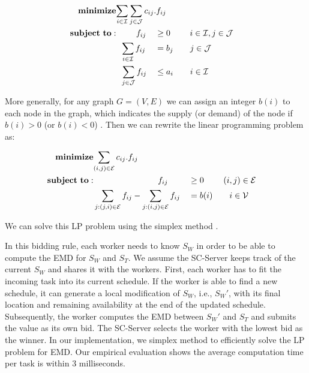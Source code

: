 \setcounter{equation}{0}
\begin{alignat}{2}
\mathbf{minimize}&\mathrlap{\sum_{i \in \mathcal{I}} \sum_{j \in \mathcal{J}} c_{ij}.f_{ij}} \notag\\
\mathbf{subject\ to:}&\phantom{{a}={a}} f_{ij} && \geq 0 \ \quad\quad i \in \mathcal{I}, j \in \mathcal{J}\\
&\phantom{{a}}\sum_{i \in \mathcal{I}} f_{ij} &&= b_j \quad\quad j \in \mathcal{J}\\
&\phantom{{a}}\sum_{j \in \mathcal{J}} f_{ij} &&\leq a_i \quad\quad i \in \mathcal{I}
\end{alignat}

More generally, for any graph $G = (V, E)$ we can assign an integer $b(i)$ to each node in the graph, which indicates the supply (or demand) of the node if $b(i) > 0$ (or $b(i) < 0$) . Then we can rewrite the linear programming problem as: 

\setcounter{equation}{0}
\begin{alignat}{2}
\mathbf{minimize}&\mathrlap{\sum_{(i,j) \in \mathcal{E}} c_{ij}.f_{ij}} \notag\\
\mathbf{subject\ to:}&\phantom{{a}={a}{a}={a}{a}={a}{a}} f_{ij} && \geq 0 \ \quad\quad (i,j) \in \mathcal{E}\\
&\sum_{j:(j,i) \in \mathcal{E}} f_{ij} - \sum_{j:(i,j) \in \mathcal{E}} f_{ij} &&= b(i) \quad\quad i \in \mathcal{V}
\end{alignat}

\noindent We can solve this LP problem using the simplex method \cite{Dantzig90}.

In this bidding rule, each worker needs to know $S_W$ in order to be able to compute the EMD for $S_W$ and $S_T$. We assume the SC-Server keeps track of the current $S_W$ and shares it with the workers. First, each worker has to fit the incoming task into its current schedule. If the worker is able to find a new schedule, it can generate a local modification of $S_W$, i.e., $S_{W}'$, with its final location and remaining availability at the end of the updated schedule. Subsequently, the worker computes the EMD between $S_{W}'$ and $S_T$ and submits the value as its own bid. The SC-Server selects the worker with the lowest bid as the winner. In our implementation, we simplex method \cite{Dantzig90} to efficiently solve the LP problem for EMD. Our empirical evaluation shows the average computation time per task is within 3 milliseconds. 


